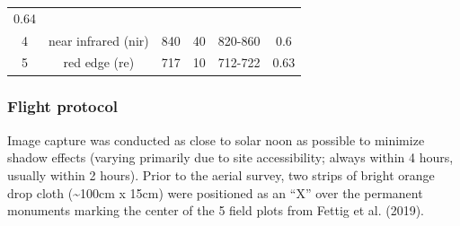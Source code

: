 \documentclass[]{article}
\begin{document}
\begin{longtable}[]{@{}cccccc@{}}
\begin{minipage}[t]{0.14\columnwidth}
0.64\strut
\end{minipage}\tabularnewline
\begin{minipage}[t]{0.10\columnwidth}\centering\strut
4\strut
\end{minipage} & \begin{minipage}[t]{0.23\columnwidth}\centering\strut
near infrared (nir)\strut
\end{minipage} & \begin{minipage}[t]{0.14\columnwidth}\centering\strut
840\strut
\end{minipage} & \begin{minipage}[t]{0.09\columnwidth}\centering\strut
40\strut
\end{minipage} & \begin{minipage}[t]{0.14\columnwidth}\centering\strut
820-860\strut
\end{minipage} & \begin{minipage}[t]{0.14\columnwidth}\centering\strut
0.6\strut
\end{minipage}\tabularnewline
\begin{minipage}[t]{0.10\columnwidth}\centering\strut
5\strut
\end{minipage} & \begin{minipage}[t]{0.23\columnwidth}\centering\strut
red edge (re)\strut
\end{minipage} & \begin{minipage}[t]{0.14\columnwidth}\centering\strut
717\strut
\end{minipage} & \begin{minipage}[t]{0.09\columnwidth}\centering\strut
10\strut
\end{minipage} & \begin{minipage}[t]{0.14\columnwidth}\centering\strut
712-722\strut
\end{minipage} & \begin{minipage}[t]{0.14\columnwidth}\centering\strut
0.63\strut
\end{minipage}\tabularnewline
\bottomrule
\end{longtable}

\subsubsection{Flight protocol}\label{flight-protocol}

Image capture was conducted as close to solar noon as possible to
minimize shadow effects (varying primarily due to site accessibility;
always within 4 hours, usually within 2 hours). Prior to the aerial
survey, two strips of bright orange drop cloth (\textasciitilde{}100cm x
15cm) were positioned as an ``X'' over the permanent monuments marking
the center of the 5 field plots from Fettig et al. (2019).
\end{document}
